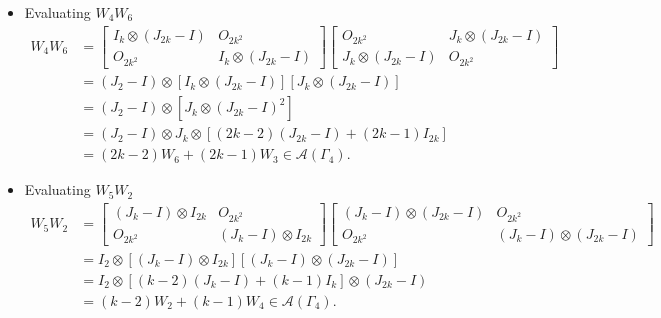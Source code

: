 \begin{itemize}
    \item Evaluating \( W_4 W_6 \)
    \begin{align*}
        W_4W_6
        &=\begin{bmatrix}
            I_{k} \otimes (J_{2k} - I) & O_{2k^2} \\
            O_{2k^2} & I_{k} \otimes (J_{2k} - I)
        \end{bmatrix}\begin{bmatrix}
            O_{2k^2} & J_k \otimes (J_{2k}-I) \\
            J_k \otimes (J_{2k}-I) & O_{2k^2}
        \end{bmatrix}\\
        &= (J_2-I)\otimes [I_{k} \otimes (J_{2k} - I)][J_k \otimes (J_{2k}-I)]\\
        &= (J_2-I)\otimes [J_{k} \otimes (J_{2k} - I)^2]\\
        &= (J_2-I)\otimes J_k\otimes  [(2k-2)(J_{2k}-I) + (2k-1)I_{2k}]\\
        &= (2k-2)W_6 +(2k-1)W_3\in\mathcal{A}(\Gamma_4).
    \end{align*}

    \item Evaluating \( W_5 W_2 \)
    \begin{align*}
        W_5 W_2
        &=\begin{bmatrix}
            (J_k-I)\otimes I_{2k} & O_{2k^2} \\
            O_{2k^2} & (J_k-I)\otimes I_{2k}
        \end{bmatrix}\begin{bmatrix}
            (J_k -I) \otimes (J_{2k} -I) & O_{2k^2}\\
            O_{2k^2} & (J_k -I) \otimes (J_{2k} -I)
        \end{bmatrix} \\
        &= I_2\otimes [(J_k-I)\otimes I_{2k}][(J_k -I) \otimes (J_{2k} -I)]\\
        &= I_2\otimes [(k-2)(J_k-I) + (k-1)I_k] \otimes (J_{2k} -I)\\
        &= (k-2)W_2 + (k-1)W_4 \in\mathcal{A}(\Gamma_4).
    \end{align*}
    

\end{itemize}
